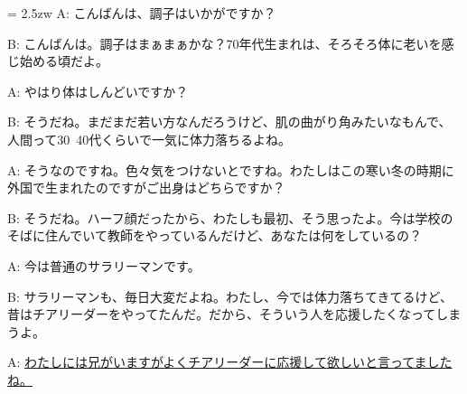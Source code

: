 \documentclass[11pt]{amsart}
\title{}
\author{}
\newenvironment{hangall}[1]{\hangindent = 2.5zw\everypar{\hangindent = 2.5zw}}{}
\begin{document}
\maketitle
\begin{hangall}{}%
A: こんばんは、調子はいかがですか？

B: こんばんは。調子はまぁまぁかな？70年代生まれは、そろそろ体に老いを感じ始める頃だよ。

A: やはり体はしんどいですか？

B: そうだね。まだまだ若い方なんだろうけど、肌の曲がり角みたいなもんで、人間って30~40代くらいで一気に体力落ちるよね。

A: そうなのですね。色々気をつけないとですね。わたしはこの寒い冬の時期に外国で生まれたのですがご出身はどちらですか？

B: そうだね。ハーフ顔だったから、わたしも最初、そう思ったよ。今は学校のそばに住んでいて教師をやっているんだけど、あなたは何をしているの？

A: 今は普通のサラリーマンです。

B: サラリーマンも、毎日大変だよね。わたし、今では体力落ちてきてるけど、昔はチアリーダーをやってたんだ。だから、そういう人を応援したくなってしまうよ。

A: \ul{わたしには兄がいますがよくチアリーダーに応援して欲しいと言ってましたね。}\end{hangall}
\end{document}
